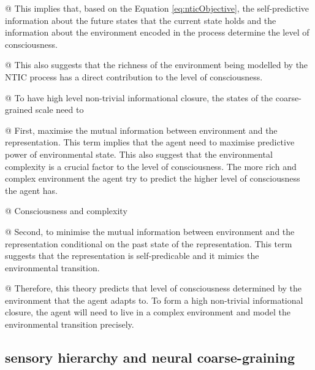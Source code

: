 \documentclass[utf8]{article}
\begin{document}
			\begin{WritingMaterials}
    			@ This implies that, based on the Equation \ref{eq:nticObjective}, the self-predictive information about the future states that the current state holds and the information about the environment encoded in the process determine the level of consciousness.
    			
    			@ This also suggests that the richness of the environment being modelled by the	NTIC process has a direct contribution to the level of consciousness.
    			

				@ To have high level non-trivial informational closure, the states of the coarse-grained scale need to

				@ First, maximise the mutual information between environment and the representation.
				This term implies that the agent need to maximise predictive power of environmental state. This also suggest that the environmental complexity is a crucial factor to the level of consciousness. The more rich and complex environment the agent try to predict the higher level of consciousness the agent has.
				
				@ Consciousness and complexity \cite{Tononi1998}


				@ Second, to minimise the mutual information between environment and the representation conditional on the past state of the representation. This term suggests that the representation is self-predicable and it mimics the environmental transition.

				@ Therefore, this theory predicts that level of consciousness determined by the environment that the agent adapts to. To form a high non-trivial informational closure, the agent will need to live in a complex environment and model the environmental transition precisely.


			\end{WritingMaterials}



		\subsection{sensory hierarchy and neural coarse-graining}\label{sec:SensoryHierarchy}
\end{document}
